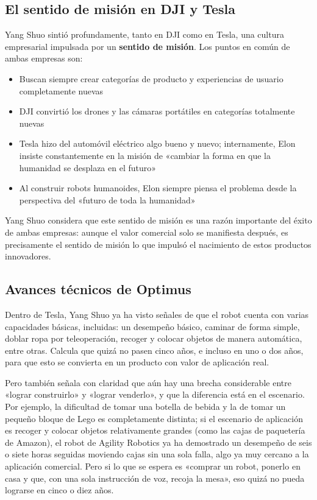 \subsection{El sentido de misión en DJI y Tesla}

Yang Shuo sintió profundamente, tanto en DJI como en Tesla, una cultura empresarial impulsada por un \textbf{sentido de misión}. Los puntos en común de ambas empresas son:

\begin{itemize}
    \item Buscan siempre crear categorías de producto y experiencias de usuario completamente nuevas
    \item DJI convirtió los drones y las cámaras portátiles en categorías totalmente nuevas
    \item Tesla hizo del automóvil eléctrico algo bueno y nuevo; internamente, Elon insiste constantemente en la misión de «cambiar la forma en que la humanidad se desplaza en el futuro»
    \item Al construir robots humanoides, Elon siempre piensa el problema desde la perspectiva del «futuro de toda la humanidad»
\end{itemize}

Yang Shuo considera que este sentido de misión es una razón importante del éxito de ambas empresas: aunque el valor comercial solo se manifiesta después, es precisamente el sentido de misión lo que impulsó el nacimiento de estos productos innovadores.

\subsection{Avances técnicos de Optimus}

Dentro de Tesla, Yang Shuo ya ha visto señales de que el robot cuenta con varias capacidades básicas, incluidas: un desempeño básico, caminar de forma simple, doblar ropa por teleoperación, recoger y colocar objetos de manera automática, entre otras. Calcula que quizá no pasen cinco años, e incluso en uno o dos años, para que esto se convierta en un producto con valor de aplicación real.

Pero también señala con claridad que aún hay una brecha considerable entre «lograr construirlo» y «lograr venderlo», y que la diferencia está en el escenario. Por ejemplo, la dificultad de tomar una botella de bebida y la de tomar un pequeño bloque de Lego es completamente distinta; si el escenario de aplicación es recoger y colocar objetos relativamente grandes (como las cajas de paquetería de Amazon), el robot de Agility Robotics ya ha demostrado un desempeño de seis o siete horas seguidas moviendo cajas sin una sola falla, algo ya muy cercano a la aplicación comercial. Pero si lo que se espera es «comprar un robot, ponerlo en casa y que, con una sola instrucción de voz, recoja la mesa», eso quizá no pueda lograrse en cinco o diez años.

